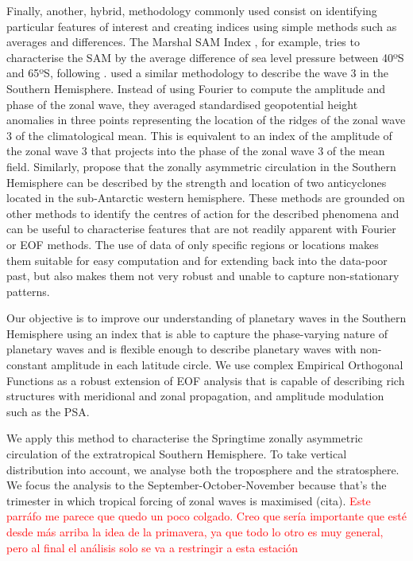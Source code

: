 \documentclass[smallextended]{svjour3}       %
\begin{document}
Finally, another, hybrid, methodology commonly used consist on identifying particular features of interest and creating indices using simple methods such as averages and differences.
The Marshal SAM Index \citep{marshall2003}, for example, tries to characterise the SAM by the average difference of sea level pressure between 40ºS and 65ºS, following \citet{gong1999}.
\citet{raphael2004} used a similar methodology to describe the wave 3 in the Southern Hemisphere.
Instead of using Fourier to compute the amplitude and phase of the zonal wave, they averaged standardised geopotential height anomalies in three points representing the location of the ridges of the zonal wave 3 of the climatological mean.
This is equivalent to an index of the amplitude of the zonal wave 3 that projects into the phase of the zonal wave 3 of the mean field.
Similarly, \citet{hobbs2010} propose that the zonally asymmetric circulation in the Southern Hemisphere can be described by the strength and location of two anticyclones located in the sub-Antarctic western hemisphere.
These methods are grounded on other methods to identify the centres of action for the described phenomena and can be useful to characterise features that are not readily apparent with Fourier or EOF methods.
The use of data of only specific regions or locations makes them suitable for easy computation and for extending back into the data-poor past, but also makes them not very robust and unable to capture non-stationary patterns.

Our objective is to improve our understanding of planetary waves in the Southern Hemisphere using an index that is able to capture the phase-varying nature of planetary waves and is flexible enough to describe planetary waves with non-constant amplitude in each latitude circle.
We use complex Empirical Orthogonal Functions \citep{horel1984} as a robust extension of EOF analysis that is capable of describing rich structures with meridional and zonal propagation, and amplitude modulation such as the PSA.

We apply this method to characterise the Springtime zonally asymmetric circulation of the extratropical Southern Hemisphere.
To take vertical distribution into account, we analyse both the troposphere and the stratosphere.
We focus the analysis to the September-October-November because that's the trimester in which tropical forcing of zonal waves is maximised (cita).
\textcolor{red}{Este parráfo me parece que quedo un poco colgado. Creo que sería importante que esté desde más arriba la idea de la primavera, ya que todo lo otro es muy general, pero al final el análisis solo se va a restringir a esta estación}
\end{document}
